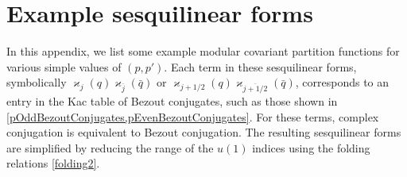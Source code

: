 \documentclass[11pt]{article}
\numberwithin{equation}{section}
\theoremstyle{definition}
\numberwithin{equation}{section}
\def\qbar{\bar q}
\def\jbar{\overline j}
\begin{document}
\section{Example sesquilinear forms}
\label{sec:Zpp'.examples}
\allowdisplaybreaks

In this appendix, we list some example modular covariant partition functions for various simple values of $(p,p')$. Each term in these sesquilinear forms, symbolically 
$\varkappa_j(q) \varkappa_{\jbar}(\qbar)$ or $\varkappa_{j+1/2}(q) \varkappa_{\overline{j+1/2}}(\qbar)$, corresponds to an entry in the Kac table of Bezout conjugates, such as those shown in \cref{pOddBezoutConjugates,pEvenBezoutConjugates}. For these terms, complex conjugation is equivalent to Bezout conjugation. The resulting sesquilinear forms are simplified by reducing the range of the $u(1)$ indices using the folding relations \eqref{folding2}.
\end{document}
